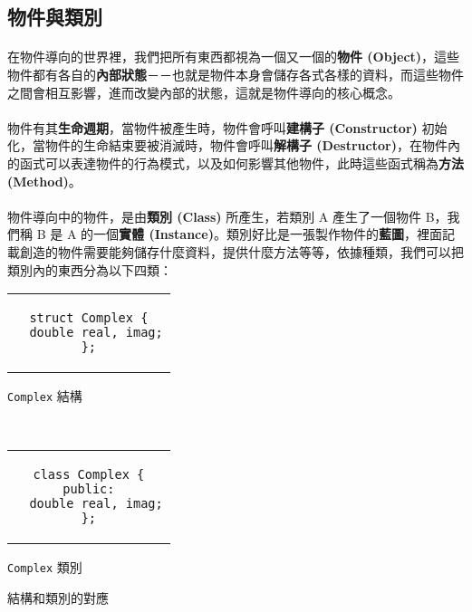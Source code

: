 \documentclass[12pt,a4paper,oneside]{report}
\begin{document}
\begin{CJK}{UTF8}{bkai}
\subsection{物件與類別}

\paragraph{}在物件導向的世界裡，我們把所有東西都視為一個又一個的\textbf{物件 (Object)}，這些物件都有各自的\textbf{內部狀態}－－也就是物件本身會儲存各式各樣的資料，而這些物件之間會相互影響，進而改變內部的狀態，這就是物件導向的核心概念。
\paragraph{}物件有其\textbf{生命週期}，當物件被產生時，物件會呼叫\textbf{建構子 (Constructor)} 初始化，當物件的生命結束要被消滅時，物件會呼叫\textbf{解構子 (Destructor)}，在物件內的函式可以表達物件的行為模式，以及如何影響其他物件，此時這些函式稱為\textbf{方法 (Method)}。
\paragraph{}物件導向中的物件，是由\textbf{類別 (Class)} 所產生，若類別 A 產生了一個物件 B，我們稱 B 是 A 的一個\textbf{實體 (Instance)}。類別好比是一張製作物件的{\color{red}\textbf{藍圖}}，裡面記載創造的物件需要能夠儲存什麼資料，提供什麼方法等等，依據種類，我們可以把類別內的東西分為以下四類：

\begin{code}[h!]
\centering
\begin{subcode}{.4\textwidth}
  \centering
  \begin{tabular}{c}
  \begin{lstlisting}
struct Complex {
  double real, imag;
};
  \end{lstlisting}
  \end{tabular}
  \caption{\texttt{Complex} 結構}
  \label{program:struct:code:class:1}
\end{subcode}
~
\begin{subcode}{.4\textwidth}
  \centering
  \begin{tabular}{c}
  \begin{lstlisting}
class Complex {
public:
  double real, imag;
};
  \end{lstlisting}
  \end{tabular}
  \caption{\texttt{Complex} 類別}
  \label{program:struct:code:class:2}
\end{subcode}
\caption{結構和類別的對應}
\label{program:struct:code:class}
\end{code}


\end{CJK}
\end{document}
